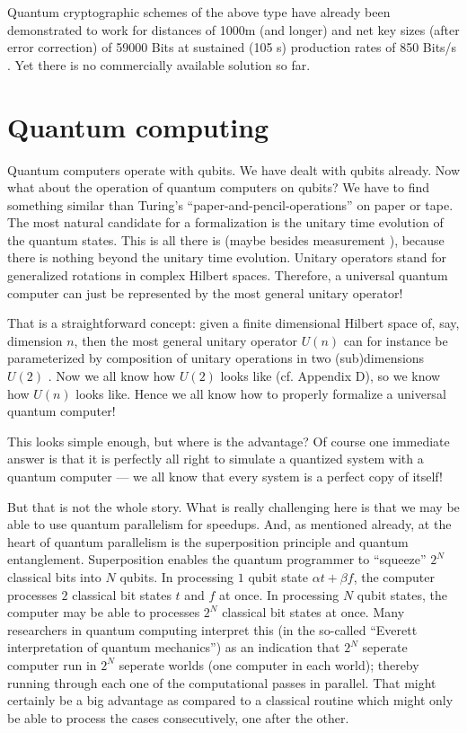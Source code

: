 \documentclass [11pt]{llncs}
\begin{document}
Quantum cryptographic schemes of the above type have already been demonstrated
to work for distances of 1000m (and longer) and net key sizes (after error correction) of 59000 Bits
at sustained (105 s) production rates of 850 Bits/s \cite{zeilinger-qc}.
Yet there is  no commercially available solution so far.


\section{Quantum computing}

Quantum computers operate with qubits.
We have dealt with  qubits already.
Now what about the operation of quantum computers on qubits?
We have to find something similar than Turing's ``paper-and-pencil-operations''
on paper or tape.
The most natural candidate for a formalization is the unitary time evolution of the quantum states.
This is all there is (maybe besides measurement
\cite{svozil-2000int}), because there is nothing beyond the unitary time evolution.
Unitary operators stand for generalized rotations in complex Hilbert spaces.
Therefore, a universal quantum computer can just be represented by the most general unitary
operator!

That is a straightforward concept: given a finite dimensional Hilbert space of, say, dimension $n$,
then the most general unitary operator $U(n)$ can for instance be parameterized by composition of unitary operations
in two (sub)dimensions $U(2)$ \cite{murnaghan}. Now we all know how $U(2)$ looks like (cf. Appendix D), so we know
how $U(n)$ looks like. Hence we all know how to properly formalize a universal quantum computer!


This looks simple enough, but where is the  advantage?
Of course one immediate answer is that it is perfectly all right to simulate
a quantized system with a quantum computer --- we all know that every system is a perfect
copy of itself!

But that is not the whole story.
What is really challenging here is that we may be able to use quantum parallelism for
speedups.
And, as mentioned already,
at the heart of quantum parallelism is the superposition principle
and quantum entanglement.
Superposition enables the quantum programmer to ``squeeze''
$2^N$ classical bits into $N$ qubits.
In processing $1$ qubit state $\alpha t+\beta f$, the computer processes $2$ classical bit states $t$ and $f$ at once.
In processing $N$ qubit states, the computer may be able to processes $2^N$ classical bit states at once.
Many researchers in quantum computing interpret this (in the so-called ``Everett interpretation of quantum mechanics'')
as an indication that $2^N$ seperate computer run in $2^N$ seperate worlds (one computer in each world);
thereby running through each one of the computational passes in parallel.
That might certainly be a big advantage as compared to a classical routine which might only be able to
process the cases consecutively, one after the other.
\end{document}
